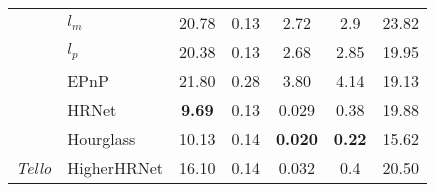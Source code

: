 \begin{table}[hbt!]
{\begin{tabular}{c|l|ccccc}
\multicolumn{1}{l|}{} &  $l_m$ & {\cellcolor{Orange} 20.78} & 0.13 & {\cellcolor{Orange} 2.72} & {\cellcolor{Orange} 2.9} & 23.82 \\
\multicolumn{1}{l|}{} & $l_p$ & {\cellcolor{Orange} 20.38} & 0.13 & {\cellcolor{Orange} 2.68} & {\cellcolor{Orange} 2.85} & 19.95 \\
\multicolumn{1}{l|}{} & EPnP & {\cellcolor{Red} 21.80} & 0.28 & {\cellcolor{Red} 3.80} & {\cellcolor{Red} 4.14} & 19.13 \\
\multicolumn{1}{l|}{} & HRNet & \textbf{9.69} & 0.13 & 0.029 & 0.38 & 19.88 \\
\multicolumn{1}{l|}{} & Hourglass & 10.13 & 0.14 & \textbf{0.020} & \textbf{0.22} & 15.62 \\
\multicolumn{1}{l|}{\multirow{-6}{*}{\textit{Tello}}} & HigherHRNet & 16.10 & 0.14 & 0.032 & 0.4 & 20.50 \\ \hline
\end{tabular}}
\end{table}